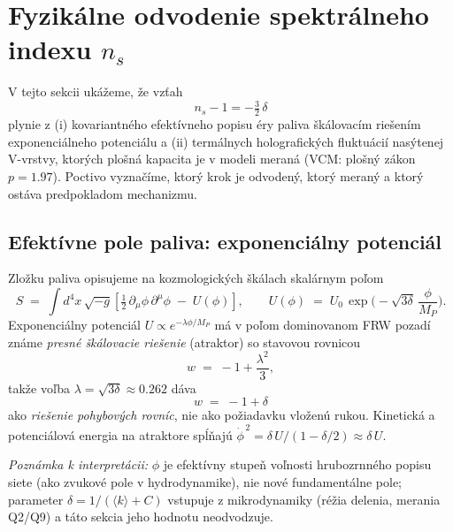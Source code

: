 
\section{Fyzikálne odvodenie spektrálneho indexu $n_s$}

V tejto sekcii ukážeme, že vzťah
\[
n_s - 1 = -\tfrac{3}{2}\,\delta
\]
plynie z (i) kovariantného efektívneho popisu éry paliva škálovacím
riešením exponenciálneho potenciálu a (ii) termálnych holografických
fluktuácií nasýtenej V-vrstvy, ktorých plošná kapacita je v modeli
meraná (VCM: plošný zákon $p = 1.97$). Poctivo vyznačíme, ktorý krok
je odvodený, ktorý meraný a ktorý ostáva predpokladom mechanizmu.

\subsection{Efektívne pole paliva: exponenciálny potenciál}

Zložku paliva opisujeme na kozmologických škálach skalárnym poľom
\[
S \;=\; \int d^4x\,\sqrt{-g}\left[\tfrac{1}{2}\,
\partial_\mu\phi\,\partial^\mu\phi \;-\; U(\phi)\right],
\qquad
U(\phi) \;=\; U_0\,\exp\!\Big(-\sqrt{3\delta}\,\frac{\phi}{M_P}\Big).
\]
Exponenciálny potenciál $U \propto e^{-\lambda\phi/M_P}$ má v poľom
dominovanom FRW pozadí známe \emph{presné škálovacie riešenie}
(atraktor) so stavovou rovnicou
\[
w \;=\; -1 + \frac{\lambda^2}{3},
\]
takže voľba $\lambda = \sqrt{3\delta}\approx 0.262$ dáva
\[
w \;=\; -1+\delta
\]
ako \emph{riešenie pohybových rovníc}, nie ako požiadavku vloženú
rukou. Kinetická a potenciálová energia na atraktore spĺňajú
$\dot\phi^{\,2} = \delta\,U/(1-\delta/2) \approx \delta\,U$.

\emph{Poznámka k interpretácii:} $\phi$ je efektívny stupeň voľnosti
hrubozrnného popisu siete (ako zvukové pole v hydrodynamike), nie nové
fundamentálne pole; parameter $\delta = 1/(\langle k\rangle + C)$
vstupuje z mikrodynamiky (réžia delenia, merania Q2/Q9) a táto sekcia
jeho hodnotu neodvodzuje.

